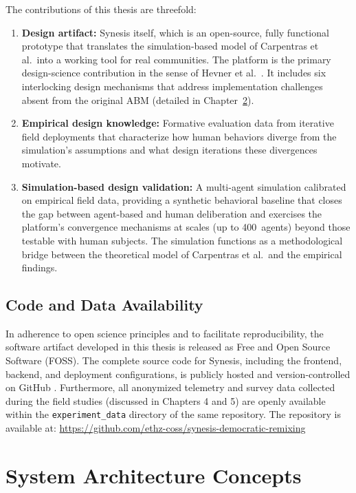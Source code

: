 \documentclass[a4paper, 12pt, twoside]{iviathesis}
\begin{document}
The contributions of this thesis are threefold:
\begin{enumerate}
    \item \textbf{Design artifact:} Synesis itself, which is an open-source, fully functional prototype that translates the simulation-based model of Carpentras et al.\ into a working tool for real communities. The platform is the primary design-science contribution in the sense of Hevner et al.\ \cite{hevner2004design}. It includes six interlocking design mechanisms that address implementation challenges absent from the original ABM (detailed in Chapter~\ref{ch:concepts}).
    \item \textbf{Empirical design knowledge:} Formative evaluation data from iterative field deployments that characterize how human behaviors diverge from the simulation's assumptions and what design iterations these divergences motivate.
    \item \textbf{Simulation-based design validation:} A multi-agent simulation calibrated on empirical field data, providing a synthetic behavioral baseline that closes the gap between agent-based and human deliberation and exercises the platform's convergence mechanisms at scales (up to 400~agents) beyond those testable with human subjects. The simulation functions as a methodological bridge between the theoretical model of Carpentras et al.\ and the empirical findings.
\end{enumerate}

\section{Code and Data Availability}
\label{sec:code-and-data-availability}

In adherence to open science principles and to facilitate reproducibility, the software artifact developed in this thesis is released as Free and Open Source Software (FOSS). The complete source code for Synesis, including the frontend, backend, and deployment configurations, is publicly hosted and version-controlled on GitHub \cite{drp_repo}. 
Furthermore, all anonymized telemetry and survey data collected during the field studies (discussed in Chapters 4 and 5) are openly available within the \texttt{experiment\_data} directory of the same repository.
The repository is available at: \url{https://github.com/ethz-coss/synesis-democratic-remixing}

\chapter{System Architecture Concepts}
\label{ch:concepts} 
\end{document}
